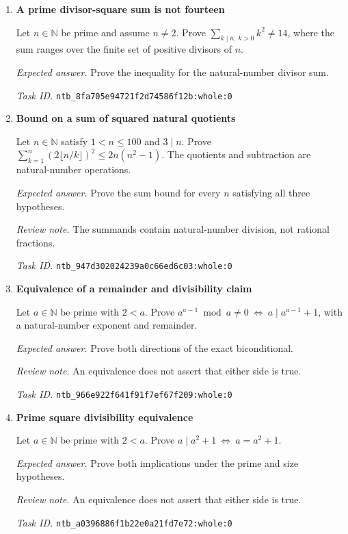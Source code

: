 \documentclass[11pt]{article}
\newcommand{\pth}[1]{\nolinkurl{#1}}
\begin{document}
\begin{enumerate}[label={TEST \arabic*.},leftmargin=4.5em,itemsep=1em]
\item \textbf{A prime divisor-square sum is not fourteen}\label{qn:test:50}

Let $n\in\mathbb N$ be prime and assume $n\ne2$. Prove $\sum_{k\mid n,\ k>0}k^2\ne14$, where the sum ranges over the finite set of positive divisors of $n$.

\emph{Expected answer.} Prove the inequality for the natural-number divisor sum.

\emph{Task ID.} \pth{ntb_8fa705e94721f2d74586f12b:whole:0}

\item \textbf{Bound on a sum of squared natural quotients}\label{qn:test:51}

Let $n\in\mathbb N$ satisfy $1<n\le100$ and $3\mid n$. Prove $\sum_{k=1}^{n}(2\lfloor n/k\rfloor)^2\le2n(n^2-1)$. The quotients and subtraction are natural-number operations.

\emph{Expected answer.} Prove the sum bound for every $n$ satisfying all three hypotheses.

\emph{Review note.} The summands contain natural-number division, not rational fractions.

\emph{Task ID.} \pth{ntb_947d302024239a0c66ed6c03:whole:0}

\item \textbf{Equivalence of a remainder and divisibility claim}\label{qn:test:52}

Let $a\in\mathbb N$ be prime with $2<a$. Prove $a^{a-1}\bmod a\ne0\ \Longleftrightarrow\ a\mid a^{a-1}+1$, with a natural-number exponent and remainder.

\emph{Expected answer.} Prove both directions of the exact biconditional.

\emph{Review note.} An equivalence does not assert that either side is true.

\emph{Task ID.} \pth{ntb_966e922f641f91f7ef67f209:whole:0}

\item \textbf{Prime square divisibility equivalence}\label{qn:test:53}

Let $a\in\mathbb N$ be prime with $2<a$. Prove $a\mid a^2+1\ \Longleftrightarrow\ a=a^2+1$.

\emph{Expected answer.} Prove both implications under the prime and size hypotheses.

\emph{Review note.} An equivalence does not assert that either side is true.

\emph{Task ID.} \pth{ntb_a0396886f1b22e0a21fd7e72:whole:0}


\end{enumerate}
\end{document}
